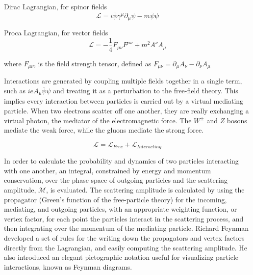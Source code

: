 \noindent Dirac Lagrangian, for spinor fields
\begin{equation}\label{eq:dirac_lagrangian}
\mathcal{L} = i\bar{\psi}\gamma^{\mu}\partial_{\mu}\psi - m\bar{\psi}\psi 
\end{equation}

\noindent Proca Lagrangian, for vector fields
\begin{equation}\label{eq:proca_lagrangian}
\mathcal{L} = -\frac{1}{4}F_{\mu\nu}F^{\mu\nu} + m^{2}A^{\nu}A_{\mu} 
\end{equation}

\noindent where $F_{\mu\nu}$, is the field strength tensor, defined as
$F_{\mu\nu} = \partial_{\mu}A_{\nu} - \partial_{\nu}A_{\mu}$

\par Interactions are generated by coupling multiple fields together in a
single term, such as $ieA_{\mu}\bar{\psi}\psi$ and treating it as a
perturbation to the free-field theory.  This implies every interaction
between particles is carried out by a virtual mediating particle.  When two
electrons scatter off one another, they are really exchanging a
virtual photon, the mediator of the electromagnetic force.  The
$W^{\pm}$ and $Z$ bosons mediate the weak force, while the gluons
mediate the strong force.  

\begin{equation}\label{eq:lagrangian_free_interacting}
\mathcal{L} = \mathcal{L}_{Free} + \mathcal{L}_{Interacting}
\end{equation}

\par In order to calculate the probability and dynamics of two
particles interacting with one another, an integral, constrained by
energy and momentum conservation, over the phase space of outgoing
particles and the scattering amplitude, $\mathcal{M}$, is evaluated.
The scattering amplitude is calculated by using the propagator (Green's
function of the free-particle theory) for the incoming, mediating, and
outgoing particles, with an appropriate weighting function, or vertex
factor, for each point the particles interact in the scattering
process, and then integrating over the momentum of the mediating
particle.  Richard Feynman developed a set of rules for the writing
down the propagators and vertex factors directly from the Lagrangian,
and easily computing the scattering amplitude.  He also introduced an
elegant pictographic notation useful for visualizing particle
interactions, known as Feynman diagrams. 

